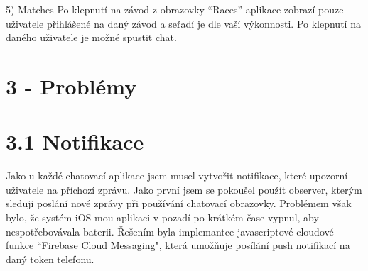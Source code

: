 \documentclass{article}
\begin{document}
5) Matches
Po klepnutí na závod z obrazovky “Races” aplikace zobrazí pouze uživatele přihlášené na daný závod a seřadí je dle vaší výkonnosti. Po klepnutí na daného uživatele je možné spustit chat.
\vspace{10 mm}










































\section{3 - Problémy}
\vspace{10 mm}

\section{3.1 Notifikace}
\vspace{10 mm}
Jako u každé chatovací aplikace jsem musel vytvořit notifikace, které upozorní uživatele na příchozí zprávu. Jako první jsem se pokoušel použít observer, kterým sleduji poslání nové zprávy při používání chatovací obrazovky. Problémem však bylo, že systém iOS mou aplikaci v pozadí po krátkém čase vypnul, aby nespotřebovávala baterii. Řešením byla implemantce javascriptové cloudové funkce “Firebase Cloud Messaging", která umožňuje posílání push notifikací na daný token telefonu. 
\vspace{10 mm}
\end{document}
